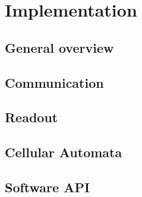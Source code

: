 
\chapter{Implementation}

\section{General overview}

\section{Communication}

\section{Readout}

\section{Cellular Automata}

\section{Software API}

\cleardoublepage